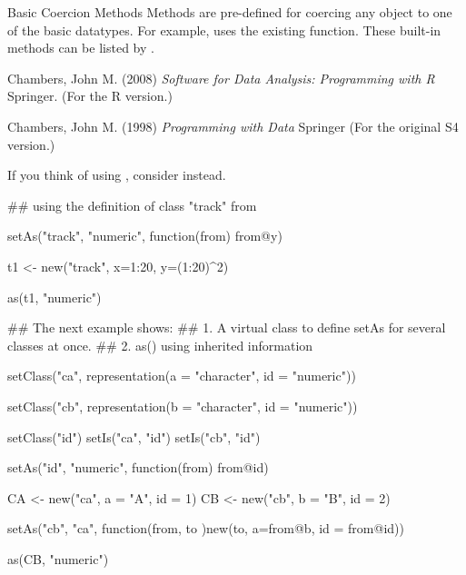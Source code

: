 %
\begin{Section}{Basic Coercion Methods}
Methods are pre-defined for coercing any object to one of the basic
datatypes.  For example,  uses the existing
 function.  These built-in methods can be listed by
.
\end{Section}
%
\begin{References}\relax
Chambers, John M. (2008)
\emph{Software for Data Analysis: Programming with R}
Springer.  (For the R version.)

Chambers, John M. (1998)
\emph{Programming with Data}
Springer (For the original S4 version.)
\end{References}
%
\begin{SeeAlso}\relax
If you think of using , consider
 instead.
\end{SeeAlso}
%
\begin{Examples}
\begin{ExampleCode}
## using the definition of class "track" from 



setAs("track", "numeric", function(from) from@y)

t1 <- new("track", x=1:20, y=(1:20)^2)

as(t1, "numeric")

## The next example shows:
##  1. A virtual class to define setAs for several classes at once.
##  2. as() using inherited information

setClass("ca", representation(a = "character", id = "numeric"))

setClass("cb", representation(b = "character", id = "numeric"))

setClass("id")
setIs("ca", "id")
setIs("cb", "id")


setAs("id", "numeric", function(from) from@id)

CA <- new("ca", a = "A", id = 1)
CB <- new("cb", b = "B", id = 2)

setAs("cb", "ca", function(from, to )new(to, a=from@b, id = from@id))

as(CB, "numeric")


\end{ExampleCode}
\end{Examples}
